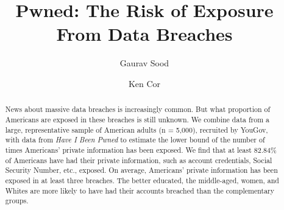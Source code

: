 \documentclass[sigconf]{acmart}
\begin{document}

\begin{comment}

setwd(paste0(githubdir, "pwned_dev/ms/"))
tools::texi2dvi("pwned.tex", pdf = TRUE, clean = TRUE)
setwd(githubdir)

\end{comment}
%
\title[Pwned]{Pwned: The Risk of Exposure From Data Breaches}

%
\author{Gaurav Sood}
\authornotemark[1]
\affiliation{%
  \institution{}
}

\author{Ken Cor}
\authornotemark[2]
\affiliation{%
  \institution{The University of Alberta}
  \city{Edmonton}
  \country{Canada}
}
%
\renewcommand{\shortauthors}{Sood and Cor}

%
\begin{abstract}
News about massive data breaches is increasingly common. But what proportion of Americans are exposed in these breaches is still unknown. We combine data from a large, representative sample of American adults (n = 5,000), recruited by YouGov, with data from \textit{Have I Been Pwned} to estimate the lower bound of the number of times Americans' private information has been exposed. We find that at least 82.84\% of Americans have had their private information, such as account credentials, Social Security Number, etc., exposed. On average, Americans' private information has been exposed in at least three breaches. The better educated, the middle-aged, women, and Whites are more likely to have had their accounts breached than the complementary groups.
\end{abstract}
\end{document}
